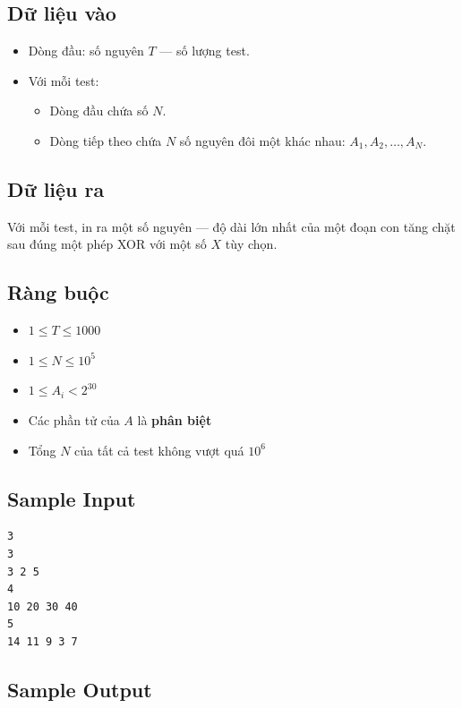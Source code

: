 \subsection*{Dữ liệu vào}

\begin{itemize}
    \item Dòng đầu: số nguyên $T$ — số lượng test.
    \item Với mỗi test:
    \begin{itemize}
        \item Dòng đầu chứa số $N$.
        \item Dòng tiếp theo chứa $N$ số nguyên đôi một khác nhau: $A_1, A_2, \ldots, A_N$.
    \end{itemize}
\end{itemize}

\subsection*{Dữ liệu ra}

Với mỗi test, in ra một số nguyên — độ dài lớn nhất của một đoạn con tăng chặt sau đúng một phép XOR với một số $X$ tùy chọn.

\subsection*{Ràng buộc}

\begin{itemize}
    \item $1 \le T \le 1000$
    \item $1 \le N \le 10^5$
    \item $1 \le A_i < 2^{30}$
    \item Các phần tử của $A$ là \textbf{phân biệt}
    \item Tổng $N$ của tất cả test không vượt quá $10^6$
\end{itemize}

\subsection*{Sample Input}

\begin{verbatim}
3
3
3 2 5
4
10 20 30 40
5
14 11 9 3 7
\end{verbatim}

\subsection*{Sample Output}

